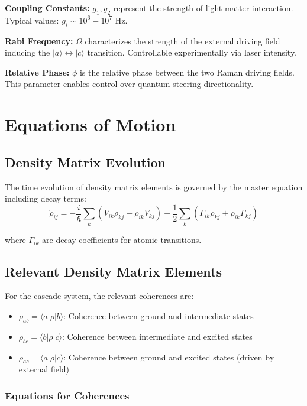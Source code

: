 \textbf{Coupling Constants:} $g_1, g_2$ represent the strength of light-matter interaction. Typical values: $g_i \sim 10^6 - 10^7$ Hz.

\textbf{Rabi Frequency:} $\Omega$ characterizes the strength of the external driving field inducing the $|a\rangle \leftrightarrow |c\rangle$ transition. Controllable experimentally via laser intensity.

\textbf{Relative Phase:} $\phi$ is the relative phase between the two Raman driving fields. This parameter enables control over quantum steering directionality.

\section{Equations of Motion}

\subsection{Density Matrix Evolution}

The time evolution of density matrix elements is governed by the master equation including decay terms:
\begin{equation}
\dot{\rho}_{ij} = -\frac{i}{\hbar}\sum_k(V_{ik}\rho_{kj} - \rho_{ik}V_{kj}) - \frac{1}{2}\sum_k(\Gamma_{ik}\rho_{kj} + \rho_{ik}\Gamma_{kj})
\end{equation}

where $\Gamma_{ik}$ are decay coefficients for atomic transitions.

\subsection{Relevant Density Matrix Elements}

For the cascade system, the relevant coherences are:
\begin{itemize}
	\item $\rho_{ab} = \langle a|\rho|b\rangle$: Coherence between ground and intermediate states
	\item $\rho_{bc} = \langle b|\rho|c\rangle$: Coherence between intermediate and excited states
	\item $\rho_{ac} = \langle a|\rho|c\rangle$: Coherence between ground and excited states (driven by external field)
\end{itemize}

\subsubsection{Equations for Coherences}

